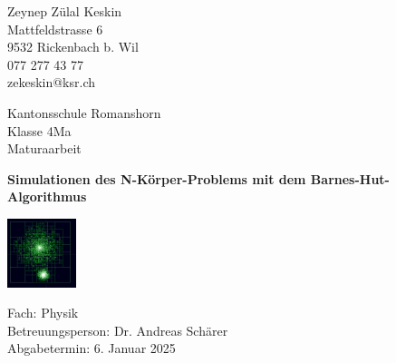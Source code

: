 \documentclass[a4paper,12pt,twoside]{article}
\begin{document}



\begin{titlepage}
	\clearpage\thispagestyle{empty}	
	
	\begin{minipage}[t]{\textwidth}
		\begin{minipage}[t]{0.5\textwidth}
			Zeynep Zülal Keskin\\
			Mattfeldstrasse 6\\
			9532 Rickenbach b. Wil\\
			077 277 43 77\\
			zekeskin@ksr.ch
		\end{minipage}
		\begin{minipage}[t]{0.5\textwidth}
			\begin{flushright}
				Kantonsschule Romanshorn\\
				Klasse 4Ma\\
				Maturaarbeit
			\end{flushright}
		\end{minipage}
	\end{minipage}
	
	\vspace{4cm}
	{
		\centering
		\Huge\bfseries Simulationen des N-Körper-Problems mit dem Barnes-Hut-Algorithmus \par
		\vspace{1cm}
		\includegraphics[width=0.15\textwidth]{Barnes_hut_tree.png}\par
	}
	
	\vspace{9cm}	
	\noindent
    Fach: Physik \noindent\\
	Betreuungsperson: Dr. Andreas Schärer\\
	Abgabetermin: 6. Januar 2025
	
\end{titlepage}
\end{document}

